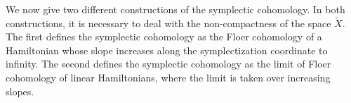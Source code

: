 

    We now give two different constructions of the symplectic cohomology. In both constructions, it is necessary to deal with the non-compactness of the space $\check X$.
    The first defines the symplectic cohomology as the Floer cohomology of a Hamiltonian whose slope increases along the symplectization coordinate to infinity. The second defines the symplectic cohomology as the limit of Floer cohomology of linear Hamiltonians, where the limit is taken over increasing slopes.
    
    
    
        
        
        
